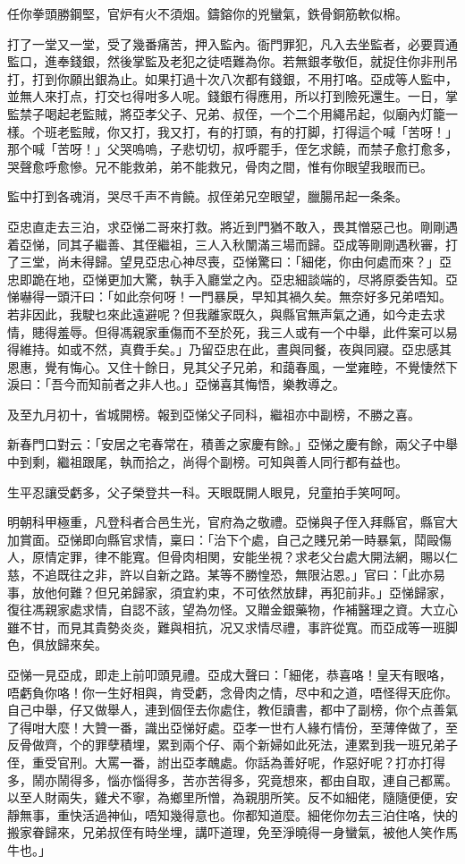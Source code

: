 \documentclass[a5paper, 12pt, openany]{book} %
\begin{document}
	任你拳頭勝鋼堅，官炉有火不須烟。鑄鎔你的兇蠻氣，鉄骨銅筋軟似棉。

	打了一堂又一堂，受了幾番痛苦，押入監內。衙門罪犯，凡入去坐監者，必要買通監口，進奉錢銀，然後掌監及老犯之徒唔難為你。若無銀孝敬佢，就捉住你非刑吊打，打到你願出銀為止。如果打過十次八次都有錢銀，不用打咯。亞成等人監中，並無人來打点，打交乜得咁多人呢。錢銀冇得應用，所以打到險死還生。一日，掌監禁子喝起老監賊，將亞孝父子、兄弟、叔侄，一个二个用繩吊起，似廟內灯籠一樣。个班老監賊，你又打，我又打，有的打頭，有的打脚，打得這个喊「苦呀！」那个喊「苦呀！」父哭嗚嗚，子悲切切，叔呼罷手，侄乞求饒，而禁子愈打愈多，哭聲愈呼愈慘。兄不能救弟，弟不能救兄，骨肉之間，惟有你眼望我眼而已。

	監中打到各魂消，哭尽千声不肯饒。叔侄弟兄空眼望，臘腸吊起一条条。

	亞忠直走去三泊，求亞悌二哥來打救。將近到門猶不敢入，畏其憎惡己也。剛剛遇着亞悌，同其子繼善、其侄繼祖，三人入秋闈滿三場而歸。亞成等剛剛遇秋審，打了三堂，尚未得歸。望見亞忠心神尽喪，亞悌驚曰：「細佬，你由何處而來？」亞忠即跪在地，亞悌更加大驚，執手入廳堂之內。亞忠細談端的，尽將原委告知。亞悌嚇得一頭汗曰：「如此奈何呀！一門暴戾，早知其禍久矣。無奈好多兄弟唔知。若非因此，我駛乜來此遠避呢？但我離家既久，與縣官無声氣之通，如今走去求情，贃得羞辱。但得馮親家重傷而不至於死，我三人或有一个中舉，此件案可以易得維持。如或不然，真費手矣。」乃留亞忠在此，晝與同餐，夜與同寢。亞忠感其恩惠，覺有悔心。又住十餘日，見其父子兄弟，和藹春風，一堂雍睦，不覺悽然下淚曰：「吾今而知前者之非人也。」亞悌喜其悔悟，樂教導之。

	及至九月初十，省城開榜。報到亞悌父子同科，繼祖亦中副榜，不勝之喜。

	新春門口對云：「安居之宅春常在，積善之家慶有餘。」亞悌之慶有餘，兩父子中舉中到剩，繼祖跟尾，執而拾之，尚得个副榜。可知與善人同行都有益也。

	生平忍讓受虧多，父子榮登共一科。天眼既開人眼見，兒童拍手笑呵呵。

	明朝科甲極重，凡登科者合邑生光，官府為之敬禮。亞悌與子侄入拜縣官，縣官大加賞面。亞悌即向縣官求情，稟曰：「治下个處，自己之賤兄弟一時暴氣，鬦毆傷人，原情定罪，律不能寬。但骨肉相関，安能坐視？求老父台處大開法網，賜以仁慈，不追既往之非，許以自新之路。某等不勝惶恐，無限沾恩。」官曰：「此亦易事，放他何難？但兄弟歸家，須宜約束，不可依然放肆，再犯前非。」亞悌歸家，復往馮親家處求情，自認不該，望為勿怪。又贈金銀藥物，作補醫理之資。大立心雖不甘，而見其貴勢炎炎，難與相抗，况又求情尽禮，事許從寬。而亞成等一班脚色，俱放歸來矣。

	亞悌一見亞成，即走上前叩頭見禮。亞成大聲曰：「細佬，恭喜咯！皇天有眼咯，唔虧負你咯！你一生好相與，肯受虧，念骨肉之情，尽中和之道，唔怪得天庇你。自己中舉，仔又做舉人，連到個侄去你處住，教佢讀書，都中了副榜，你个点善氣了得咁大麼！大贊一番，識出亞悌好處。亞孝一世冇人緣冇情份，至薄倖做了，至反骨做齊，个的罪孽積埋，累到兩个仔、兩个新婦如此死法，連累到我一班兄弟子侄，重受官刑。大罵一番，詂出亞孝醜處。你話為善好呢，作惡好呢？打亦打得多，鬧亦鬧得多，惱亦惱得多，苦亦苦得多，究竟想來，都由自取，連自己都罵。以至人財兩失，雞犬不寧，為鄉里所憎，為親朋所笑。反不如細佬，隨隨便便，安靜無事，重快活過神仙，唔知幾得意也。你都知道麼。細佬你勿去三泊住咯，快的搬家眷歸來，兄弟叔侄有時坐埋，講吓道理，免至淨曉得一身蠻氣，被他人笑作馬牛也。」
\end{document}
